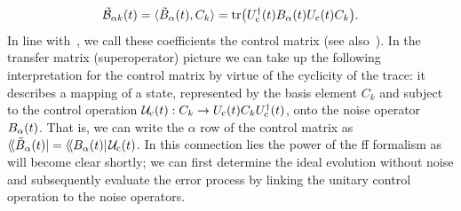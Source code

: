 \begin{equation}\label{eq:ff:control_matrix}
    \tilde{\mathcal{B}}_{\alpha k}(t) = \langle\tilde{B}_\alpha(t), C_k\rangle  = \tr(U_{\mathrm{c}}^\dagger(t)B_\alpha(t)U_{\mathrm{c}}(t)C_k).
\end{equation}
In line with~\citeauthor{Green2013}, we call these coefficients the control matrix (see also~).
In the transfer matrix (superoperator) picture we can take up the following interpretation for the control matrix by virtue of the cyclicity of the trace: it describes a mapping of a state, represented by the basis element $C_k$ and subject to the control operation $\mathcal{U}_{\mathrm{c}}(t): C_k\rightarrow U_{\mathrm{c}}(t) C_kU_{\mathrm{c}}^\dagger(t)$, onto the noise operator $B_\alpha(t)$.
That is, we can write the $\alpha$ row of the control matrix as $\langle\!\langle{\Bat(t)}\rvert = \dbra{\Ba(t)}\liouvUc(t)$.
In this connection lies the power of the \gls{ff} formalism as will become clear shortly; we can first determine the ideal evolution without noise and subsequently evaluate the error process by linking the unitary control operation to the noise operators.

